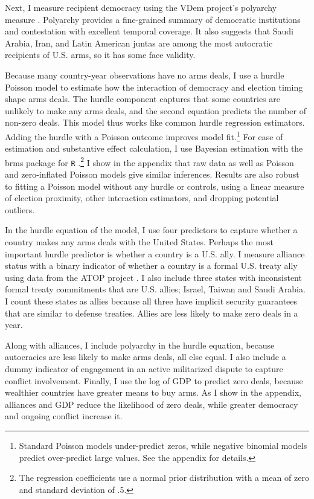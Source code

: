 \documentclass[12pt]{article}
\begin{document}
Next, I measure recipient democracy using the VDem project's polyarchy measure \citep{Coppedgeetal2008}. 
Polyarchy provides a fine-grained summary of democratic institutions and contestation with excellent temporal coverage.
It also suggests that Saudi Arabia, Iran, and Latin American juntas are among the most autocratic recipients of U.S. arms, so it has some face validity.  


Because many country-year observations have no arms deals, I use a hurdle Poisson model to estimate how the interaction of democracy and election timing shape arms deals.
The hurdle component captures that some countries are unlikely to make any arms deals, and the second equation predicts the number of non-zero deals.
This model thus works like common hurdle regression estimators.  
Adding the hurdle with a Poisson outcome improves model fit.\footnote{Standard Poisson models under-predict zeros, while negative binomial models predict over-predict large values. See the appendix for details.} 
For ease of estimation and substantive effect calculation, I use Bayesian estimation with the brms package for \texttt{R} \citep{Buerkner2017}.\footnote{The regression coefficients use a normal prior distribution with a mean of zero and standard deviation of .5.}
I show in the appendix that raw data as well as Poisson and zero-inflated Poisson models give similar inferences. 
Results are also robust to fitting a Poisson model without any hurdle or controls, using a linear measure of election proximity, other interaction estimators, and dropping potential outliers.


In the hurdle equation of the model, I use four predictors to capture whether a country makes any arms deals with the United States. 
Perhaps the most important hurdle predictor is whether a country is a U.S. ally. 
I measure alliance status with a binary indicator of whether a country is a formal U.S. treaty ally using data from the ATOP project \citep{Leedsetal2002}.
I also include three states with inconsistent formal treaty commitments that are U.S. allies; Israel, Taiwan and Saudi Arabia. 
I count these states as allies because all three have implicit security guarantees that are similar to defense treaties.
Allies are less likely to make zero deals in a year.  


Along with alliances, I include polyarchy in the hurdle equation, because autocracies are less likely to make arms deals, all else equal. 
I also include a dummy indicator of engagement in an active militarized dispute to capture conflict involvement. 
Finally, I use the log of GDP to predict zero deals, because wealthier countries have greater means to buy arms.
As I show in the appendix, alliances and GDP reduce the likelihood of zero deals, while greater democracy and ongoing conflict increase it. 
\end{document}

